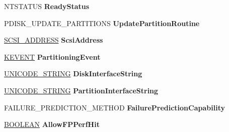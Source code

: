 \begin{DoxyCompactItemize}
\begin{tabbing}
\end{tabbing}\item 
\mbox{\label{struct___d_i_s_k___d_a_t_a_a50bc8a481d85c1bf3317474da611349a}} 
N\+T\+S\+T\+A\+T\+US {\bfseries Ready\+Status}
\item 
\mbox{\label{struct___d_i_s_k___d_a_t_a_ac5169e4199de70a4fa5096d647b9acb1}} 
P\+D\+I\+S\+K\+\_\+\+U\+P\+D\+A\+T\+E\+\_\+\+P\+A\+R\+T\+I\+T\+I\+O\+NS {\bfseries Update\+Partition\+Routine}
\item 
\mbox{\label{struct___d_i_s_k___d_a_t_a_aeec180476f324d30ceb7f4a091098de6}} 
\hyperlink{struct___s_c_s_i___a_d_d_r_e_s_s}{S\+C\+S\+I\+\_\+\+A\+D\+D\+R\+E\+SS} {\bfseries Scsi\+Address}
\item 
\mbox{\label{struct___d_i_s_k___d_a_t_a_a4da6634ca6f15a06002f2559dfd30f07}} 
\hyperlink{struct___k_e_v_e_n_t}{K\+E\+V\+E\+NT} {\bfseries Partitioning\+Event}
\item 
\mbox{\label{struct___d_i_s_k___d_a_t_a_ad2fd9ed64fc9f80425d19be3b12a50e0}} 
\hyperlink{struct___u_n_i_c_o_d_e___s_t_r_i_n_g}{U\+N\+I\+C\+O\+D\+E\+\_\+\+S\+T\+R\+I\+NG} {\bfseries Disk\+Interface\+String}
\item 
\mbox{\label{struct___d_i_s_k___d_a_t_a_afe9b4372516eaeeb82fba4ea0d7909ac}} 
\hyperlink{struct___u_n_i_c_o_d_e___s_t_r_i_n_g}{U\+N\+I\+C\+O\+D\+E\+\_\+\+S\+T\+R\+I\+NG} {\bfseries Partition\+Interface\+String}
\item 
\mbox{\label{struct___d_i_s_k___d_a_t_a_a8b21836b21f9992f78fdcb249e483011}} 
F\+A\+I\+L\+U\+R\+E\+\_\+\+P\+R\+E\+D\+I\+C\+T\+I\+O\+N\+\_\+\+M\+E\+T\+H\+OD {\bfseries Failure\+Prediction\+Capability}
\item 
\mbox{\label{struct___d_i_s_k___d_a_t_a_a19c266f36a393de1783a0b127a934c2b}} 
\hyperlink{_processor_bind_8h_a112e3146cb38b6ee95e64d85842e380a}{B\+O\+O\+L\+E\+AN} {\bfseries Allow\+F\+P\+Perf\+Hit}
\item 
\mbox{\label{struct___d_i_s_k___d_a_t_a_acf5b6f4c9d710649fa76d6932709fd72}} 

\end{DoxyCompactItemize}
